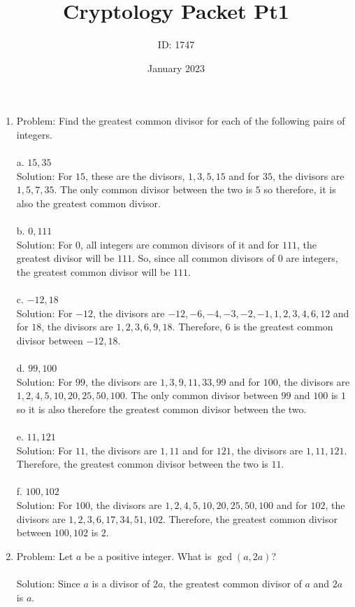 \documentclass[]{article}
\date{January 2023}
\author{ID: 1747}
\title{Cryptology Packet Pt1}
\begin{document}
\maketitle

\begin{enumerate}
    \item Problem: Find the greatest common divisor for each of the following pairs of integers.
    \\\\a. $15, 35$
    \\ Solution: For $15$, these are the divisors, $1,3,5,15$ and for $35$, the divisors are $1,5,7,35$. The only common divisor between the two is $5$ so therefore, it is also the greatest common divisor.
    \\\\b. $0,111$
    \\ Solution: For $0$, all integers are common divisors of it and for $111$, the greatest divisor will be $111$. So, since all common divisors of $0$ are integers, the greatest common divisor will be $111$.
    \\\\c. $-12,18$
    \\ Solution: For $-12$, the divisors are $-12,-6,-4,-3,-2,-1,1,2,3,4,6,12$ and for $18$, the divisors are $1,2,3,6,9,18$. Therefore, $6$ is the greatest common divisor between $-12, 18$.
    \\\\d. $99,100$
    \\ Solution: For $99$, the divisors are $1,3,9,11,33,99$ and for $100$, the divisors are $1,2,4,5,10,20,25,50,100$. The only common divisor between $99$ and $100$ is $1$ so it is also therefore the greatest common divisor between the two.
    \\\\e. $11,121$
    \\ Solution: For $11$, the divisors are $1,11$ and for $121$, the divisors are $1,11,121$. Therefore, the greatest common divisor between the two is $11$.
    \\\\f. $100, 102$
    \\ Solution: For $100$, the divisors are $1,2,4,5,10,20,25,50,100$ and for $102$, the divisors are $1,2,3,6,17, 34,51,102$. Therefore, the greatest common divisor between $100,102$ is $2$.
    \item Problem: Let $a$ be a positive integer. What is $\gcd(a, 2a)$?
    \\\\ Solution: Since $a$ is a divisor of $2a$, the greatest common divisor of $a$ and $2a$ is $a$.

\end{enumerate}
\end{document}
